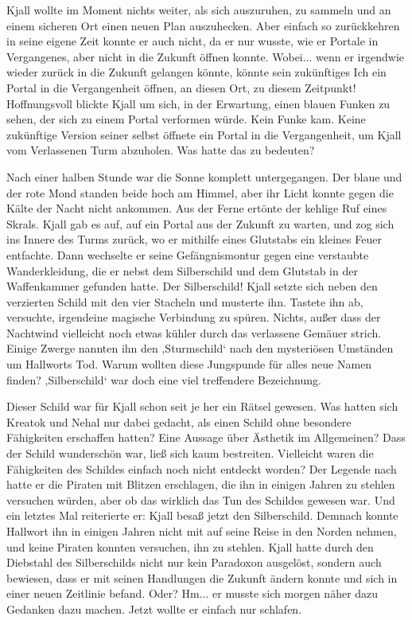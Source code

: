 Kjall wollte im Moment nichts weiter, als sich auszuruhen, zu sammeln und an einem sicheren Ort einen neuen Plan auszuhecken. Aber einfach so zurückkehren in seine eigene Zeit konnte er auch nicht, da er nur wusste, wie er Portale in Vergangenes, aber nicht in die Zukunft öffnen konnte. Wobei... wenn er irgendwie wieder zurück in die Zukunft gelangen könnte, könnte sein zukünftiges Ich ein Portal in die Vergangenheit öffnen, an diesen Ort, zu diesem Zeitpunkt! Hoffnungsvoll blickte Kjall um sich, in der Erwartung, einen blauen Funken zu sehen, der sich zu einem Portal verformen würde. Kein Funke kam. Keine zukünftige Version seiner selbst öffnete ein Portal in die Vergangenheit, um Kjall vom Verlassenen Turm abzuholen. Was hatte das zu bedeuten?

Nach einer halben Stunde war die Sonne komplett untergegangen. Der blaue und der rote Mond standen beide hoch am Himmel, aber ihr Licht konnte gegen die Kälte der Nacht nicht ankommen. Aus der Ferne ertönte der kehlige Ruf eines Skrals. Kjall gab es auf, auf ein Portal aus der Zukunft zu warten, und zog sich ins Innere des Turms zurück, wo er mithilfe eines Glutstabs ein kleines Feuer entfachte. Dann wechselte er seine Gefängnismontur gegen eine verstaubte Wanderkleidung, die er nebst dem Silberschild und dem Glutstab in der Waffenkammer gefunden hatte. Der Silberschild! Kjall setzte sich neben den verzierten Schild mit den vier Stacheln und musterte ihn. Tastete ihn ab, versuchte, irgendeine magische Verbindung zu spüren. Nichts, außer dass der Nachtwind vielleicht noch etwas kühler durch das verlassene Gemäuer strich. Einige Zwerge nannten ihn den ‚Sturmschild‘ nach den mysteriösen Umständen um Hallworts Tod. Warum wollten diese Jungspunde für alles neue Namen finden? ‚Silberschild‘ war doch eine viel treffendere Bezeichnung.

Dieser Schild war für Kjall schon seit je her ein Rätsel gewesen. Was hatten sich Kreatok und Nehal nur dabei gedacht, als einen Schild ohne besondere Fähigkeiten erschaffen hatten? Eine Aussage über Ästhetik im Allgemeinen? Dass der Schild wunderschön war, ließ sich kaum bestreiten. Vielleicht waren die Fähigkeiten des Schildes einfach noch nicht entdeckt worden? Der Legende nach hatte er die Piraten mit Blitzen erschlagen, die ihn in einigen Jahren zu stehlen versuchen würden, aber ob das wirklich das Tun des Schildes gewesen war. Und ein letztes Mal reiterierte er: Kjall besaß jetzt den Silberschild. Demnach konnte Hallwort ihn in einigen Jahren nicht mit auf seine Reise in den Norden nehmen, und keine Piraten konnten versuchen, ihn zu stehlen. Kjall hatte durch den Diebstahl des Silberschilds nicht nur kein Paradoxon ausgelöst, sondern auch bewiesen, dass er mit seinen Handlungen die Zukunft ändern konnte und sich in einer neuen Zeitlinie befand. Oder? Hm... er musste sich morgen näher dazu Gedanken dazu machen. Jetzt wollte er einfach nur schlafen.

